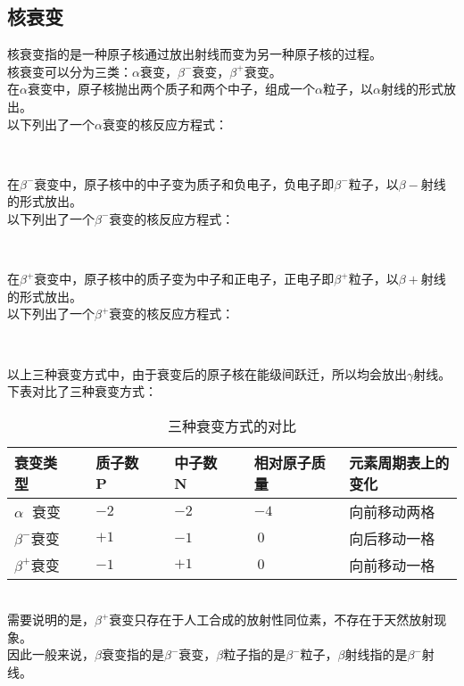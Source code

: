 \documentclass[UTF8]{ctexart}
\begin{document}
\subsection{核衰变}
    核衰变指的是一种原子核通过放出射线而变为另一种原子核的过程。\\[3mm]
    核衰变可以分为三类：$\alpha$衰变，$\beta^-$衰变，$\beta^+$衰变。\\[5mm]
    在$\alpha$衰变中，原子核抛出两个质子和两个中子，组成一个$\alpha$粒子，以$\alpha$射线的形式放出。\\[3mm]
    以下列出了一个$\alpha$衰变的核反应方程式：
    \begin{center}
        \\[5mm]
    \end{center}
    在$\beta^-$衰变中，原子核中的中子变为质子和负电子，负电子即$\beta^-$粒子，以$\beta-$射线的形式放出。\\[3mm]
    以下列出了一个$\beta^-$衰变的核反应方程式：
    \begin{center}
        \\[5mm]
    \end{center}
    在$\beta^+$衰变中，原子核中的质子变为中子和正电子，正电子即$\beta^+$粒子，以$\beta+$射线的形式放出。\\[3mm]
    以下列出了一个$\beta^+$衰变的核反应方程式：
    \begin{center}
        \\[5mm]
    \end{center}
    以上三种衰变方式中，由于衰变后的原子核在能级间跃迁，所以均会放出$\gamma$射线。\\[6mm]
    下表对比了三种衰变方式：\vspace{5pt}
    \begin{table}[h]
        \begin{center}
            \begin{tabular}{l|l|l|l|l}
                \hline
                衰变类型~~~~&质子数P~~~~&中子数N~~~~&相对原子质量~~~~&元素周期表上的变化~~~~\\ \hline
                $\alpha~~\,$衰变&$-2$&$-2$&$-4$&向前移动两格\\ \hline
                $\beta^-$衰变&$+1$&$-1$&$~0$&向后移动一格\\ \hline
                $\beta^+$衰变&$-1$&$+1$&$~0$&向前移动一格\\ \hline
            \end{tabular}
            \caption{三种衰变方式的对比}
        \end{center}
    \end{table}\\
    需要说明的是，$\beta^+$衰变只存在于人工合成的放射性同位素，不存在于天然放射现象。\\[3mm]
    因此一般来说，$\beta$衰变指的是$\beta^-$衰变，$\beta$粒子指的是$\beta^-$粒子，$\beta$射线指的是$\beta^-$射线。
\end{document}
